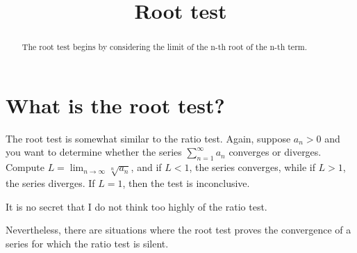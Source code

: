 \documentclass{ximera}
\title{Root test}
\begin{document}
\begin{abstract}
  The root test begins by considering the limit of the n-th root of the n-th term.
\end{abstract}

\maketitle

\section{What is the root test?}

The root test is somewhat similar to the ratio test.  Again, suppose \(a_n > 0\) and you want to determine whether the series \(\sum_{n=1}^\infty a_n\) converges or diverges.  Compute \(L = \displaystyle\lim_{n\to\infty} \sqrt[n]{a_{n}}\), and if \(L < 1\), the series converges, while if \(L > 1\), the series diverges.  If \(L = 1\), then the test is inconclusive.

It is no secret that I do not think too highly of the ratio test.


Nevertheless, there are situations where the root test proves the convergence of a series for which the ratio test is silent.
\end{document}
